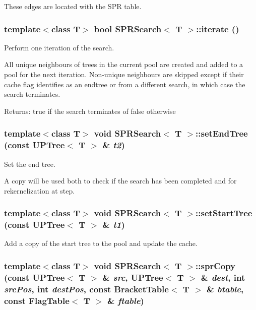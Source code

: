 These edges are located with the SPR table. 
\subsubsection{\setlength{\rightskip}{0pt plus 5cm}template$<$class T$>$ bool {\bf SPRSearch}$<$ T $>$::iterate ()}\label{classSPRSearch_a4}


Perform one iteration of the search. 

All unique neighbours of trees in the current pool are created and added to a pool for the next iteration. Non-unique neighbours are skipped except if their cache flag identifies as an endtree or from a different search, in which case the search terminates. \begin{Desc}
\item[Returns:]true if the search terminates of false otherwise \end{Desc}
\subsubsection{\setlength{\rightskip}{0pt plus 5cm}template$<$class T$>$ void {\bf SPRSearch}$<$ T $>$::set\-End\-Tree (const {\bf UPTree}$<$ T $>$ \& {\em t2})}\label{classSPRSearch_a3}


Set the end tree. 

A copy will be used both to check if the search has been completed and for rekernelization at step. 
\subsubsection{\setlength{\rightskip}{0pt plus 5cm}template$<$class T$>$ void {\bf SPRSearch}$<$ T $>$::set\-Start\-Tree (const {\bf UPTree}$<$ T $>$ \& {\em t1})}\label{classSPRSearch_a2}


Add a copy of the start tree to the pool and update the cache. 

\subsubsection{\setlength{\rightskip}{0pt plus 5cm}template$<$class T$>$ void {\bf SPRSearch}$<$ T $>$::spr\-Copy (const {\bf UPTree}$<$ T $>$ \& {\em src}, {\bf UPTree}$<$ T $>$ \& {\em dest}, int {\em src\-Pos}, int {\em dest\-Pos}, const {\bf Bracket\-Table}$<$ T $>$ \& {\em btable}, const {\bf Flag\-Table}$<$ T $>$ \& {\em ftable})\hspace{0.3cm}{\tt  [protected]}}\label{classSPRSearch_b3}


